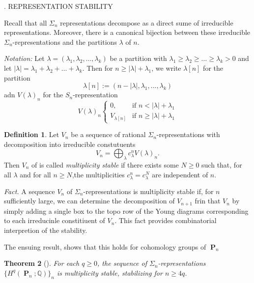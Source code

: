 \documentclass[11pt, letterpaper, notitlepage, oneside]{amsart}
\DeclareMathOperator{\PB}{\mathbf{P}}
\newcommand{\bbQ}{\mathbb{Q}}
\theoremstyle{definition}
\newtheorem{definition}{Definition}
\theoremstyle{plain}
\newtheorem{Theorem}[definition]{Theorem}
\begin{document}
\vspace{10pt}

. REPRESENTATION STABILITY
\vspace{10pt}

\noindent Recall that all $\Sigma_n$ representations decompose as a direct sume of irreducible representations. Moreover, there is a canonical bijection between these irreducible $\Sigma_n$-representations and the partitions $\lambda$ of $n$.

\noindent \textit{Notation:} Let $\lambda=(\lambda_1, \lambda_2, \dots, \lambda_k)$ be a partition with $\lambda_1\geq \lambda_2\geq \dots\geq\lambda_k>0$ and let $|\lambda|=\lambda_1+ \lambda_2+ \dots+ \lambda_k$.  Then for $n\geq |\lambda|+\lambda_1$, we write $\lambda[n]$ for the partition $$\lambda[n]:= (n-|\lambda|, \lambda_1,\dots, \lambda_k)$$
adn $V(\lambda)_n$ for the $S_n$-representation
$$V(\lambda)_n\begin{cases} 0, & \text{if } n < |\lambda| +\lambda_1\\
    V_{\lambda[n]}& \text{if } n\geq  |\lambda| +\lambda_1
     \end{cases}$$
     \vspace{5pt}


\begin{definition} 
     Let $V_n$ be a sequence of rational $\Sigma_n$-representations with decomposition into irreducible constutuents
          $$V_n= \bigoplus_{\lambda} c_{\lambda}^n V(\lambda)_n.$$
     Then $V_n$ of is called \emph{multiplicity stable}  if there exists some $N\geq 0$ such that, for all $\lambda$ and for all $n\geq N$,the multiplicities $c_{\lambda}^n = c_{\lambda}^N$ are independent of $n$.
     \end{definition}

\noindent \textit{Fact.} A sequence $V_n$ of $\Sigma_n$-representations is multiplicity stable if, for $n$ sufficiently large, we can determine the decomposition of $V_{n+1}$ frin that $V_n$ by simply adding a single box to the topo row of the Young diagrams corresponding to each irreducinle constitiuent of $V_n$. This fact provides combinatorial interpretion of the stability.

\noindent The ensuing result, shows that this holds for cohomology groups of $\PB_n$




 \begin{Theorem}[\cite{church2013representation}] For each $q\geq 0$, the sequence of $\Sigma_n$-representations $\{H^q(\PB_n; \bbQ)\}_n$ is multiplicity stable, stabilizing for $n\geq 4q$.
        \end{Theorem}
\vspace{1pt}
\end{document}
